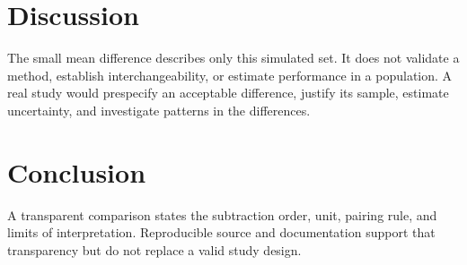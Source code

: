 \section{Discussion}
\label{sec:discussion}

The small mean difference describes only this simulated set. It does not
validate a method, establish interchangeability, or estimate performance in a
population. A real study would prespecify an acceptable difference, justify its
sample, estimate uncertainty, and investigate patterns in the differences.

\section{Conclusion}
\label{sec:conclusion}

A transparent comparison states the subtraction order, unit, pairing rule, and
limits of interpretation. Reproducible source and documentation support that
transparency but do not replace a valid study design.
